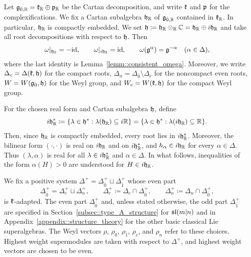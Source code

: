 Let $\gg_{\bar0,\RR}=\kk_{\RR}\oplus\pp_{\RR}$ be the Cartan decomposition, and write $\kk$ and $\pp$ for the complexifications. We fix a Cartan subalgebra $\hh_{\RR}$ of $\gg_{\bar0,\RR}$ contained in $\kk_{\RR}$. In particular, $\hh_{\RR}$ is compactly embedded. We set $\hh\coloneqq\hh_{\RR}\otimes_{\RR}\CC=\hh_{\RR}\oplus i\hh_{\RR}$ and take all root decompositions with respect to $\hh$. Then
\begin{equation}
\omega|_{\hh_{\RR}}=-\mathrm{id},
\qquad
\omega|_{i\hh_{\RR}}=\mathrm{id},
\qquad
\omega(\gg^\alpha)=\gg^{-\alpha}
\quad(\alpha\in\Delta),
\end{equation}
where the last identity is Lemma~\ref{lemm::consistent_omega}. Moreover, we write $\Delta_c=\Delta(\kk,\hh)$ for the compact roots, $\Delta_n=\Delta_{\bar0}\setminus\Delta_c$ for the noncompact even roots, $W=W(\even,\hh)$ for the Weyl group, and $W_c=W(\kk,\hh)$ for the compact Weyl group.


For the chosen real form and Cartan subalgebra $\hh$, define
\begin{equation*}
i\hh_{\RR}^{\ast}
\coloneqq
\{\lambda\in\hh^{\ast}:\lambda(\hh_{\RR})\subseteq i\RR\}
=
\{\lambda\in\hh^{\ast}:\lambda(i\hh_{\RR})\subseteq\RR\}.
\end{equation*}
Then, since $\hh_{\RR}$ is compactly embedded, every root lies in $i\hh_{\RR}^{\ast}$. Moreover, the bilinear form $(\cdot,\cdot)$ is real on $i\hh_{\RR}$ and on $i\hh_{\RR}^{\ast}$, and $h_\alpha\in i\hh_{\RR}$ for every $\alpha\in\Delta$. Thus $(\lambda,\alpha)$ is real for all $\lambda\in i\hh_{\RR}^{\ast}$ and $\alpha\in\Delta$. In what follows, inequalities of the form $\alpha(H)>0$ are understood for $H\in i\hh_{\RR}$.

We fix a positive system $\Delta^+=\Delta_{\bar0}^+\sqcup\Delta_{\bar1}^+$ whose even part
\begin{equation}
\Delta_{\bar0}^+=\Delta_c^+\sqcup\Delta_n^+,
\qquad
\Delta_c^+\coloneqq\Delta_c\cap\Delta_{\bar0}^+,
\qquad
\Delta_n^+\coloneqq\Delta_n\cap\Delta_{\bar0}^+,
\end{equation}
is $\kk$-adapted. The even part $\Delta_{\bar0}^+$ and, unless stated otherwise, the odd part $\Delta_{\bar1}^+$ are specified in Section~\ref{subsec::type_A_structure} for $\sl(m\vert n)$ and in Appendix~\ref{appendix::structure_theory} for the other basic classical Lie superalgebras. The Weyl vectors $\rho$, $\rho_{\bar0}$, $\rho_{\bar1}$, $\rho_c$, and $\rho_n$ refer to these choices. Highest weight supermodules are taken with respect to $\Delta^+$, and highest weight vectors are chosen to be even.

